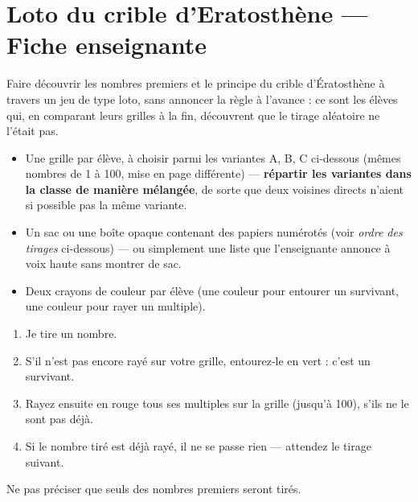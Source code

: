 

\section*{Loto du crible d'Eratosthène --- Fiche enseignant\textperiodcentered e}

\begin{tcolorbox}[colback=white, colframe=themeColor, title=Objectif, fonttitle=\bfseries]
Faire découvrir les nombres premiers et le principe du crible d'Ératosthène à travers un jeu de type loto, sans annoncer la règle à l'avance : ce sont les élèves qui, en comparant leurs grilles à la fin, découvrent que le \og tirage aléatoire\fg{} ne l'était pas.
\end{tcolorbox}

\begin{tcolorbox}[colback=white, colframe=themeColor, title=Matériel, fonttitle=\bfseries]
\begin{itemize}
\item Une grille par élève, à choisir parmi les variantes A, B, C ci-dessous (mêmes nombres de 1 à 100, mise en page différente) --- \textbf{répartir les variantes dans la classe de manière mélangée}, de sorte que deux voisin\textperiodcentered es directs n'aient si possible pas la même variante.
\item Un sac ou une boîte opaque contenant des papiers numérotés (voir \emph{ordre des tirages} ci-dessous) --- ou simplement une liste que l'enseignant\textperiodcentered e annonce à voix haute sans montrer de sac.
\item Deux crayons de couleur par élève (une couleur pour entourer un survivant, une couleur pour rayer un multiple).
\end{itemize}
\end{tcolorbox}

\begin{tcolorbox}[colback=white, colframe=themeColor, title=Règle annoncée aux élèves, fonttitle=\bfseries]
\begin{enumerate}
\item Je tire un nombre.
\item S'il n'est pas encore rayé sur votre grille, entourez-le en vert : c'est un \og survivant\fg.
\item Rayez ensuite en rouge tous ses multiples sur la grille (jusqu'à 100), s'ils ne le sont pas déjà.
\item Si le nombre tiré est déjà rayé, il ne se passe rien --- attendez le tirage suivant.
\end{enumerate}
Ne pas préciser que seuls des nombres premiers seront tirés.
\end{tcolorbox}

